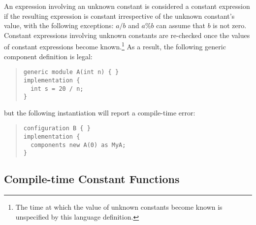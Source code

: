 \documentclass[11pt,letterpaper]{article}
\begin{document}
An expression involving an unknown constant is considered a constant
expression if the resulting expression is constant irrespective of the
unknown constant's value, with the following exceptions: $a / b$ and $a \%
b$ can assume that $b$ is not zero. Constant expressions involving unknown
constants are re-checked once the values of constant expressions become
known.\footnote{The time at which the value of unknown constants become
known is unspecified by this language definition.} As a result, the
following generic component definition is legal:
\begin{quote}
\begin{verbatim}
generic module A(int n) { }
implementation {
  int s = 20 / n;
}
\end{verbatim}
\end{quote}
but the following instantiation will report a compile-time error:
\begin{quote}
\begin{verbatim}
configuration B { }
implementation {
  components new A(0) as MyA;
}
\end{verbatim}
\end{quote}

\subsection{Compile-time Constant Functions}
\label{sec:constant-functions}
\end{document}
